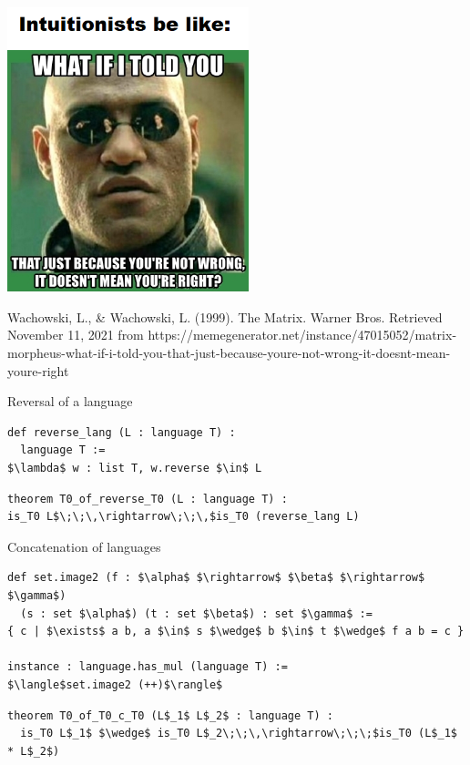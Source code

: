 \documentclass{beamer}
\begin{document}
	\begin{frame}
		\begin{center}
			\includegraphics[width=7cm]{intuitionists}
		\end{center}
		
		\tiny Wachowski, L., \& Wachowski, L. (1999). The Matrix. Warner Bros. Retrieved November 11, 2021 from https://memegenerator.net/instance/47015052/matrix-morpheus-what-if-i-told-you-that-just-because-youre-not-wrong-it-doesnt-mean-youre-right
	\end{frame}
	
	\begin{frame}[fragile]{Reversal of a language}
\begin{lstlisting}
def reverse_lang (L : language T) :
  language T :=
$\lambda$ w : list T, w.reverse $\in$ L
\end{lstlisting}
\pause
\begin{lstlisting}
theorem T0_of_reverse_T0 (L : language T) :
is_T0 L$\;\;\,\rightarrow\;\;\,$is_T0 (reverse_lang L)
\end{lstlisting}
	\end{frame}
	
	\begin{frame}[fragile]{Concatenation of languages}
\begin{lstlisting}
def set.image2 (f : $\alpha$ $\rightarrow$ $\beta$ $\rightarrow$ $\gamma$)
  (s : set $\alpha$) (t : set $\beta$) : set $\gamma$ :=
{ c | $\exists$ a b, a $\in$ s $\wedge$ b $\in$ t $\wedge$ f a b = c }

instance : language.has_mul (language T) :=
$\langle$set.image2 (++)$\rangle$
\end{lstlisting}
\pause
\begin{lstlisting}
theorem T0_of_T0_c_T0 (L$_1$ L$_2$ : language T) :
  is_T0 L$_1$ $\wedge$ is_T0 L$_2\;\;\,\rightarrow\;\;\;$is_T0 (L$_1$ * L$_2$)
\end{lstlisting}
	\end{frame}
	
\end{document}
